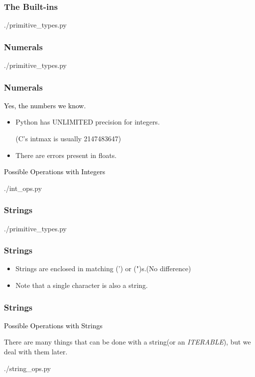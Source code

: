 \documentclass{beamer}
\begin{document}
\begin{frame}
  \frametitle{The Built-ins}
    \begin{lstinputlisting}
      {./primitive_types.py}
    \end{lstinputlisting}
\end{frame}

\begin{frame}
  \frametitle{Numerals}
    \begin{lstinputlisting}[firstline=1, lastline=6]
      {./primitive_types.py}
    \end{lstinputlisting}
\end{frame}

\begin{frame}
  \frametitle{Numerals}
  \textcolor{black}{Yes, the numbers we know.}
  \begin{itemize}
    \item Python has \alert{UNLIMITED} precision for integers.

      (C's intmax is usually 2147483647)
    \item There are errors present in floats.
  \end{itemize}

\end{frame}

\begin{frame}
  \textcolor{black}{\large{Possible Operations with Integers}}
    \begin{lstinputlisting}
      {./int_ops.py}
    \end{lstinputlisting}
\end{frame}

\begin{frame}
  \frametitle{Strings}
    \begin{lstinputlisting}[firstline=8, lastline=12]
      {./primitive_types.py}
    \end{lstinputlisting}

\end{frame}

\begin{frame}
  \frametitle{Strings}
  \begin{itemize}
    \item Strings are enclosed in matching (') or (")s.(No difference)
    \item Note that a single character is also a string.
  \end{itemize}
\end{frame}

\begin{frame}
  \frametitle{Strings}
  \textcolor{black}{\large{Possible Operations with Strings}}

  There are many things that can be done with a string(or an
  \textit{ITERABLE}), but we deal with them later.
  \begin{lstinputlisting}
    {./string_ops.py}
  \end{lstinputlisting}
\end{frame}
\end{document}
